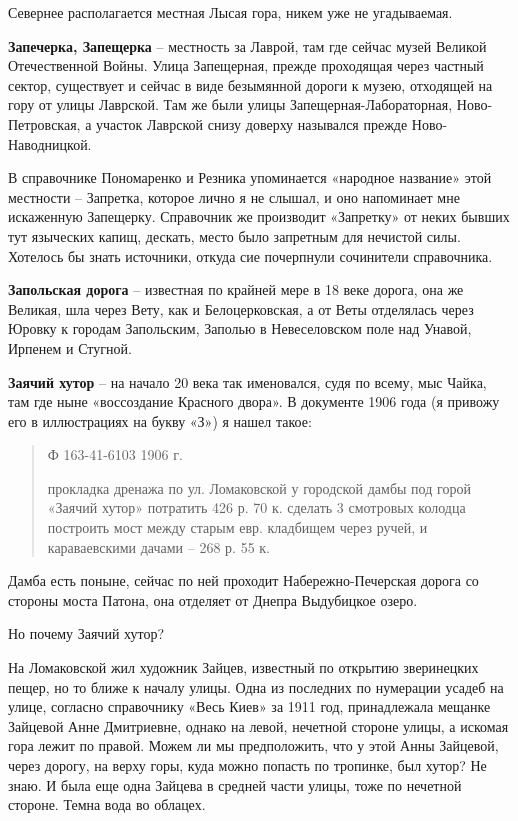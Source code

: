 Севернее располагается местная Лысая гора, никем уже не угадываемая.\\

\medskip

\textbf{Запечерка, Запещерка} – местность за Лаврой, там где сейчас музей Великой Отечественной Войны. Улица Запещерная, прежде проходящая через частный сектор, существует и сейчас в виде безымянной дороги к музею, отходящей на гору от улицы Лаврской. Там же были улицы Запещерная-Лабораторная, Ново-Петровская, а участок Лаврской снизу доверху назывался прежде Ново-Наводницкой.

В справочнике Пономаренко и Резника упоминается «народное название» этой местности – Запретка, которое лично я не слышал, и оно напоминает мне искаженную Запещерку. Справочник же производит «Запретку» от неких бывших тут языческих капищ, дескать, место было запретным для нечистой силы. Хотелось бы знать источники, откуда сие почерпнули сочинители справочника.\\

\medskip

\textbf{Запольская дорога} – известная по крайней мере в 18 веке дорога, она же Великая, шла через Вету, как и Белоцерковская, а от Веты отделялась через Юровку к городам Запольским, Заполью в Невеселовском поле над Унавой, Ирпенем и Стугной.\\

\medskip


\textbf{Заячий хутор} – на начало 20 века так именовался, судя по всему, мыс Чайка, там где ныне «воссоздание Красного двора». В документе 1906 года (я привожу его в иллюстрациях на букву «З») я нашел такое:

\begin{quotation}
Ф 163-41-6103 1906 г.

прокладка дренажа по ул. Ломаковской у городской дамбы под горой «Заячий хутор» потратить 426 р. 70 к. сделать 3 смотровых колодца построить мост между старым евр. кладбищем через ручей, и караваевскими дачами – 268 р. 55 к.
\end{quotation}

Дамба есть поныне, сейчас по ней проходит Набережно-Печерская дорога со стороны моста Патона, она отделяет от Днепра Выдубицкое озеро.

Но почему Заячий хутор?

На Ломаковской жил художник Зайцев, известный по открытию зверинецких пещер, но то ближе к началу улицы. Одна из последних по нумерации усадеб на улице, согласно справочнику «Весь Киев» за 1911 год, принадлежала мещанке Зайцевой Анне Дмитриевне, однако на левой, нечетной стороне улицы, а искомая гора лежит по правой. Можем ли мы предположить, что у этой Анны Зайцевой, через дорогу, на верху горы, куда можно попасть по тропинке, был хутор? Не знаю. И была еще одна Зайцева в средней части улицы, тоже по нечетной стороне. Темна вода во облацех.\\

